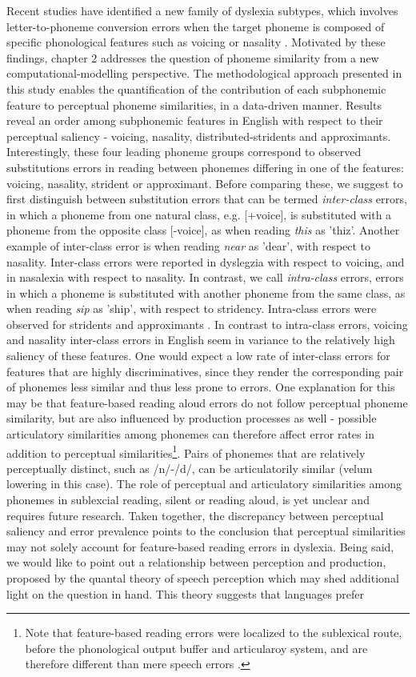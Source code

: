 Recent studies have identified a new family of dyslexia subtypes, which involves letter-to-phoneme conversion errors when the target phoneme is composed of specific phonological features such as voicing or nasality \citep{Gvion2010, Gvion2012, kf11}. Motivated by these findings, chapter 2 addresses the question of phoneme similarity from a new computational-modelling perspective. The methodological approach presented in this study enables the quantification of the contribution of each subphonemic feature to perceptual phoneme similarities, in a data-driven manner. Results reveal an order among subphonemic features in English with respect to their perceptual saliency - voicing, nasality, distributed-stridents and approximants. Interestingly, these four leading phoneme groups correspond to observed substitutions errors in reading between phonemes differing in one of the features: voicing, nasality, strident or approximant. Before comparing these, we suggest to first distinguish between substitution errors that can be termed \textit{inter-class} errors, in which a phoneme from one natural class, e.g. [+voice], is substituted with a phoneme from the opposite class [-voice], as when reading {\it this} as 'thiz'. Another example of inter-class error is when reading {\it near} as 'dear', with respect to nasality. Inter-class errors were reported in dyslegzia with respect to voicing, and in nasalexia with respect to nasality. In contrast, we call \textit{intra-class} errors, errors in which a phoneme is substituted with another phoneme from the same class, as when reading {\it sip} as 'ship', with respect to stridency. Intra-class errors were observed for stridents and approximants \citep{Gvion2010}. In contrast to intra-class errors, voicing and nasality inter-class errors in English seem in variance to the relatively high saliency of these features. One would expect a low rate of inter-class errors for features that are highly discriminatives, since they render the corresponding pair of phonemes less similar and thus less prone to errors. One explanation for this may be that feature-based reading aloud errors do not follow perceptual phoneme similarity, but are also influenced by production processes as well - possible articulatory similarities among phonemes can therefore affect error rates in addition to perceptual similarities\footnote{Note that feature-based reading errors were localized to the sublexical route, before the phonological output buffer and articularoy system, and are therefore different than mere speech errors \citep{Gvion2010}.}. Pairs of phonemes that are relatively perceptually distinct, such as /n/-/d/, can be articulatorily similar (velum lowering in this case). The role of perceptual and articulatory similarities among phonemes in sublexcial reading, silent or reading aloud, is yet unclear and requires future research. Taken together, the discrepancy between perceptual saliency and error prevalence points to the conclusion that perceptual similarities may not solely account for feature-based reading errors in dyslexia. Being said, we would like to point out a relationship between perception and production, proposed by the quantal theory of speech perception which may shed additional light on the question in hand. This theory suggests that languages prefer 